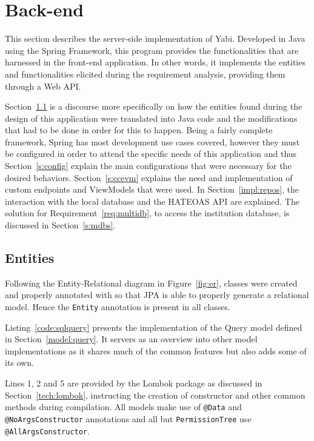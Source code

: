 \section{Back-end}\label{cha:implementation:sec:back-end}
This section describes the server-side implementation of \gls{Yabi}. Developed in Java using the Spring Framework, this program provides the functionalities that are harnessed in the front-end application. In other words, it implements the entities and functionalities elicited during the requirement analysis, providing them through a Web \gls{API}.

Section~\ref{s:entity} is a discourse more specifically on how the entities found during the design of this application were translated into Java code and the modifications that had to be done in order for this to happen. Being a fairly complete framework, Spring has most development use cases covered, however they must be configured in order to attend the specific needs of this application and thus Section~\ref{s:config} explain the main configurations that were necessary for the desired behaviors. Section~\ref{s:ccevm} explains the need and implementation of custom endpoints and ViewModels that were used. In Section~\ref{impl:repos}, the interaction with the local database and the \gls{HATEOAS} \gls{API} are explained. The solution for Requirement~\ref{req:multidb}, to access the institution database, is discussed in Section~\ref{s:mdbs}.

\subsection{Entities}\label{s:entity}
Following the Entity-Relational diagram in Figure~\ref{fig:er}, classes were created and properly annotated with so that \gls{JPA} is able to properly generate a relational model. Hence the \texttt{Entity} annotation is present in all classes.

Listing~\ref{code:sqlquery} presents the implementation of the Query model defined in Section~\ref{model:query}. It servers as an overview into other model implementations as it shares much of the common features but also adds some of its own.

Lines 1, 2 and 5 are provided by the Lombok package as discussed in Section~\ref{tech:lombok}, instructing the creation of constructor and other common methods during compilation. All models make use of \texttt{@Data} and \texttt{@NoArgsConstructor} annotations and all but \texttt{PermissionTree} use \texttt{@AllArgsConstructor}.

